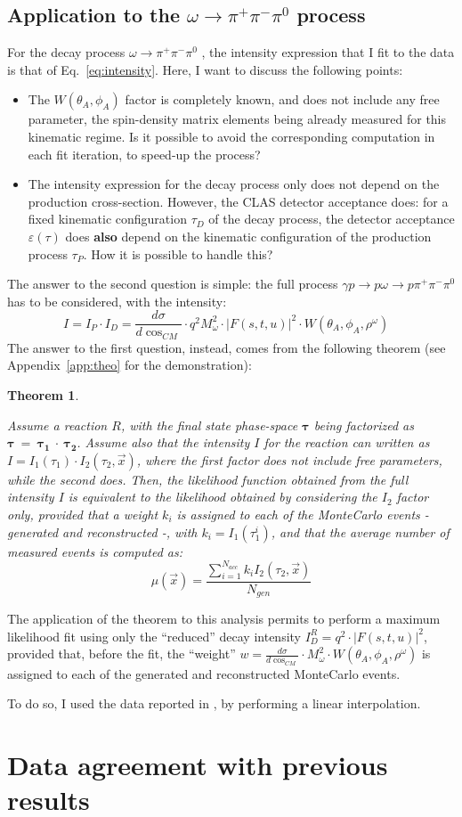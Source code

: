 \documentclass[a4paper,10pt]{report}
\newcommand{\decay}{$\omega \rightarrow \pi^+ \pi^- \pi^0$ }
\newcommand{\fullreaction}{$\gamma p \rightarrow p \omega \rightarrow p \pi^+ \pi^- \pi^{0}$ }
\newtheorem{theorem}{Theorem}
\newcommand{\printteolike}{
Assume a reaction $R$, with the final state phase-space $\mathbf{\tau}$ being factorized as $\mathbf{\tau}~=~\mathbf{\tau_1}~\cdot~\mathbf{\tau_2}$.
Assume also that the intensity $I$ for the reaction can written as $I=I_1(\tau_1) \cdot I_2(\tau_2,\vec{x})$,
where the first factor does not include free parameters, while the second does. Then, the likelihood function obtained from the full intensity $I$ is equivalent to the
likelihood obtained by considering the $I_2$ factor only, provided that a weight $k_i$ is assigned to each of the MonteCarlo events -generated and reconstructed -, with $k_i=I_1(\tau^i_1)$, and that the average number of measured events is computed as:
\begin{equation}
\mu(\vec{x})=\frac{\sum_{i=1}^{N_{acc}}k_iI_2(\tau_2,\vec{x})}{N_{gen}}
\end{equation}
}
\begin{document}
\section{Application to the \decay process}\label{sec:application}

For the decay process \decay, the intensity expression that I fit to the data is that of Eq.~\ref{eq:intensity}. Here, I want to discuss the following points:
\begin{itemize}
\item{The $W(\theta_A,\phi_A)$ factor is completely known, and does not include any free parameter, the spin-density matrix elements being already measured for this kinematic regime.
Is it possible to avoid the corresponding computation in each fit iteration, to speed-up the process?}
\item{The intensity expression for the decay process only does not depend on the production cross-section. However, the CLAS detector acceptance does: for a fixed kinematic configuration $\tau_D$ of the decay process,
the detector acceptance $\varepsilon(\tau)$ does \textbf{also} depend on the kinematic configuration of the production process $\tau_P$. How it is possible to handle this?}
\end{itemize}

The answer to the second question is simple: the full process \fullreaction has to be considered, with the intensity:
\begin{equation}\label{eq:fullintensity}
I = I_P \cdot I_D = \frac{d\sigma}{d\cos_{CM}}\cdot q^2M^2_\omega \cdot |F(s,t,u)|^2 \cdot W(\theta_A, \phi_A, \rho^\omega) \; \; \;
\end{equation}
The answer to the first question, instead, comes from the following theorem (see Appendix~\ref{app:theo} for the demonstration):
\begin{theorem}
\label{theorem}
\printteolike
\end{theorem}

The application of the theorem to this analysis permits to perform a maximum likelihood fit using only the ``reduced'' decay intensity $I^{R}_D=q^2\cdot |F(s,t,u)|^2$, provided that, before the fit, the ``weight'' 
$w= \frac{d\sigma}{d\cos_{CM}}\cdot M^2_\omega \cdot W(\theta_A, \phi_A, \rho^\omega)$ is assigned to each of the generated and reconstructed MonteCarlo events.

To do so, I used the data reported in \cite{Williams:2009ab}, by performing a linear interpolation. 

\chapter{Data agreement with previous results}
\end{document}

